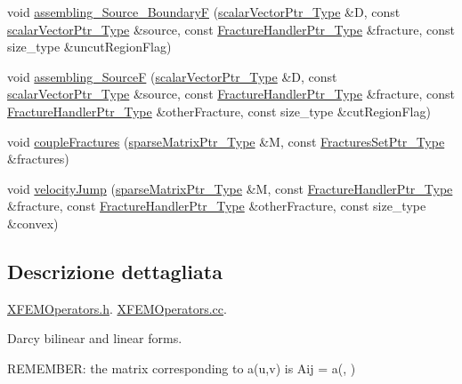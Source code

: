\begin{DoxyCompactItemize}
\item 
void \hyperlink{namespacegetfem_ac08fe08fb325eede94ffe4968b7980de}{assembling\-\_\-\-Source\-\_\-\-Boundary\-F} (\hyperlink{Core_8h_ab09b6fa3c23db1b8c60456f8690c44a7}{scalar\-Vector\-Ptr\-\_\-\-Type} \&D, const \hyperlink{Core_8h_ab09b6fa3c23db1b8c60456f8690c44a7}{scalar\-Vector\-Ptr\-\_\-\-Type} \&source, const \hyperlink{FractureHandler_8h_af23fb7a30aaff864bd42587af4f1e78a}{Fracture\-Handler\-Ptr\-\_\-\-Type} \&fracture, const size\-\_\-type \&uncut\-Region\-Flag)
\item 
void \hyperlink{namespacegetfem_a5efeefe94dfb5427c3ecf63d0b342c57}{assembling\-\_\-\-Source\-F} (\hyperlink{Core_8h_ab09b6fa3c23db1b8c60456f8690c44a7}{scalar\-Vector\-Ptr\-\_\-\-Type} \&D, const \hyperlink{Core_8h_ab09b6fa3c23db1b8c60456f8690c44a7}{scalar\-Vector\-Ptr\-\_\-\-Type} \&source, const \hyperlink{FractureHandler_8h_af23fb7a30aaff864bd42587af4f1e78a}{Fracture\-Handler\-Ptr\-\_\-\-Type} \&fracture, const \hyperlink{FractureHandler_8h_af23fb7a30aaff864bd42587af4f1e78a}{Fracture\-Handler\-Ptr\-\_\-\-Type} \&other\-Fracture, const size\-\_\-type \&cut\-Region\-Flag)
\item 
void \hyperlink{namespacegetfem_a9a0b9f7498668cda8b547b10ac914a34}{couple\-Fractures} (\hyperlink{Core_8h_a87137a9501b38c724ac80bc955164bb7}{sparse\-Matrix\-Ptr\-\_\-\-Type} \&M, const \hyperlink{FracturesSet_8h_ac29a2a91d3af77fb459980a7db47f420}{Fractures\-Set\-Ptr\-\_\-\-Type} \&fractures)
\item 
void \hyperlink{namespacegetfem_ad30c51da96437cccb950494a83601842}{velocity\-Jump} (\hyperlink{Core_8h_a87137a9501b38c724ac80bc955164bb7}{sparse\-Matrix\-Ptr\-\_\-\-Type} \&M, const \hyperlink{FractureHandler_8h_af23fb7a30aaff864bd42587af4f1e78a}{Fracture\-Handler\-Ptr\-\_\-\-Type} \&fracture, const \hyperlink{FractureHandler_8h_af23fb7a30aaff864bd42587af4f1e78a}{Fracture\-Handler\-Ptr\-\_\-\-Type} \&other\-Fracture, const size\-\_\-type \&convex)
\end{DoxyCompactItemize}


\subsection{Descrizione dettagliata}
\hyperlink{XFEMOperators_8h}{X\-F\-E\-M\-Operators.\-h}. \hyperlink{XFEMOperators_8cc}{X\-F\-E\-M\-Operators.\-cc}.

Darcy bilinear and linear forms.

R\-E\-M\-E\-M\-B\-E\-R\-: the matrix corresponding to a(u,v) is Aij = a(, ) 

